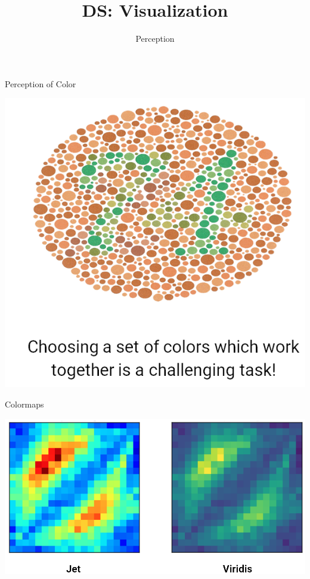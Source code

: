 \documentclass[aspectratio=169]{../latex_main/tntbeamer}  %
\title[Visualization]{DS: Visualization}
\subtitle{Perception}
\begin{document}
	
	\maketitle
	\begin{frame}{Perception of Color}

	        \centering
	        \includegraphics[scale=.45]{Bild60}

	\end{frame}
	
	
	
	\begin{frame}{Colormaps}

	        \centering
	        \includegraphics[scale=.45]{Bild61}

	\end{frame}
	
\end{document}
